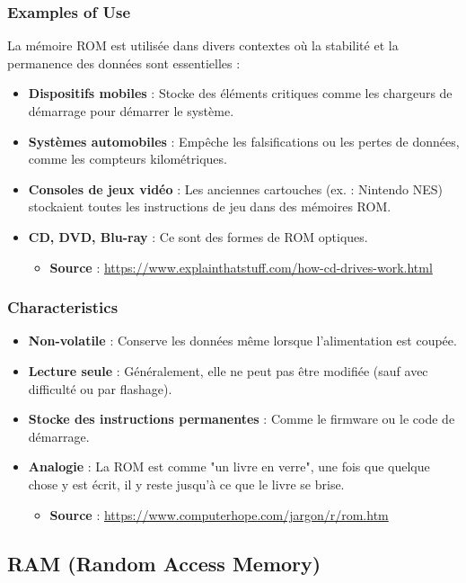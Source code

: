 \documentclass[10pt,a4paper]{article}
\begin{document}
\subsubsection*{Examples of Use}
La mémoire ROM est utilisée dans divers contextes où la stabilité et la permanence des données sont essentielles :
\begin{itemize}
    \item \textbf{Dispositifs mobiles} : Stocke des éléments critiques comme les chargeurs de démarrage pour démarrer le système.
    \item \textbf{Systèmes automobiles} : Empêche les falsifications ou les pertes de données, comme les compteurs kilométriques.
    \item \textbf{Consoles de jeux vidéo} : Les anciennes cartouches (ex. : Nintendo NES) stockaient toutes les instructions de jeu dans des mémoires ROM.
    \item \textbf{CD, DVD, Blu-ray} : Ce sont des formes de ROM optiques.
    \begin{itemize}
        \item \textbf{Source} : \url{https://www.explainthatstuff.com/how-cd-drives-work.html}
    \end{itemize}
\end{itemize}

\subsubsection*{Characteristics}
\begin{itemize}
    \item \textbf{Non-volatile} : Conserve les données même lorsque l'alimentation est coupée.
    \item \textbf{Lecture seule} : Généralement, elle ne peut pas être modifiée (sauf avec difficulté ou par flashage).
    \item \textbf{Stocke des instructions permanentes} : Comme le firmware ou le code de démarrage.
    \item \textbf{Analogie} : La ROM est comme "un livre en verre", une fois que quelque chose y est écrit, il y reste jusqu'à ce que le livre se brise.
    \begin{itemize}
        \item \textbf{Source} : \url{https://www.computerhope.com/jargon/r/rom.htm}
    \end{itemize}
\end{itemize}

\subsection*{RAM (Random Access Memory)}
\end{document}

